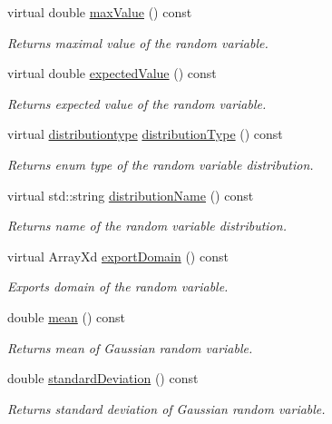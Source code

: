 \begin{DoxyCompactItemize}
virtual double \hyperlink{class_c_gaussian_c_r_v_a0b51f23a85bd3ab3e78556e7db197c49}{max\-Value} () const 
\begin{DoxyCompactList}\small\item\em Returns maximal value of the random variable. \end{DoxyCompactList}\item 
virtual double \hyperlink{class_c_gaussian_c_r_v_a20650fed2a45e12bfc72a98efb6c8e31}{expected\-Value} () const 
\begin{DoxyCompactList}\small\item\em Returns expected value of the random variable. \end{DoxyCompactList}\item 
virtual \hyperlink{class_c_random_variable_a80d2a87c43847274138b51f7d713d7f1}{distributiontype} \hyperlink{class_c_gaussian_c_r_v_a0d0141959e157a70ddf385f352783880}{distribution\-Type} () const 
\begin{DoxyCompactList}\small\item\em Returns enum type of the random variable distribution. \end{DoxyCompactList}\item 
virtual std\-::string \hyperlink{class_c_gaussian_c_r_v_ab13ee0ed20d5cf3cbd2a78747478cb7a}{distribution\-Name} () const 
\begin{DoxyCompactList}\small\item\em Returns name of the random variable distribution. \end{DoxyCompactList}\item 
virtual Array\-Xd \hyperlink{class_c_gaussian_c_r_v_ad270874d334fca26179df8e1dfa9285b}{export\-Domain} () const 
\begin{DoxyCompactList}\small\item\em Exports domain of the random variable. \end{DoxyCompactList}\item 
double \hyperlink{class_c_gaussian_c_r_v_a69d0fb4ea3de3663d40790bad062f59b}{mean} () const 
\begin{DoxyCompactList}\small\item\em Returns mean of Gaussian random variable. \end{DoxyCompactList}\item 
double \hyperlink{class_c_gaussian_c_r_v_aed32c4b96a9f3d99474b6e7b7ab5a308}{standard\-Deviation} () const 
\begin{DoxyCompactList}\small\item\em Returns standard deviation of Gaussian random variable. \end{DoxyCompactList}\item 

\end{DoxyCompactItemize}

